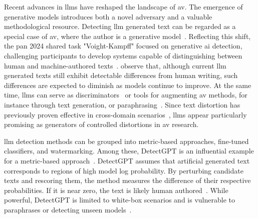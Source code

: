 Recent advances in \acp{llm} have reshaped the landscape of \ac{av}. 
The emergence of generative models introduces both a novel adversary and a valuable methodological resource.
Detecting \ac{llm} generated text can be regarded as a special case of \ac{av}, where the author is a generative model~\citep{bevendorff_overview_2024}. 
Reflecting this shift, the \ac{pan} 2024 shared task "Voight-Kampff" focused on generative \ac{ai} detection, challenging participants to develop systems capable of distinguishing between human and machine-authored texts~\citep{bevendorff_overview_2024,ayele_overview_2024}.
\citet{llm_detection_av_2025} observe that, although current \ac{llm} generated texts still exhibit detectable differences from human writing, such differences are expected to diminish as models continue to improve.
At the same time, \acp{llm} can serve as discriminators~\citep{futrzynski_pairwise_2021} or tools for augmenting \ac{av} methods, for instance through text generation, or paraphrasing~\citep{mao_raidar_2024,baradia_mirror_2025}.
Since text distortion has previously proven effective in cross-domain scenarios~\citep{bischoff_importance_2020}, \acp{llm} appear particularly promising as generators of controlled distortions in \ac{av} research.

\Ac{llm} detection methods can be grouped into metric-based approaches, fine-tuned classifiers, and watermarking. 
Among these, DetectGPT is an influential example for a metric-based approach~\citep{wang_stumbling_2024}.
DetectGPT assumes that artificial generated text corresponds to regions of high model log probability. 
By perturbing candidate texts and rescoring them, the method measures the difference of their respective probabilities.
If it is near zero, the text is likely human authored~\citep{mitchell_detectgpt_2023}. 
While powerful, DetectGPT is limited to white-box scenarios %
and is vulnerable to paraphrases or detecting unseen models~\citep{Wu_ODD_challenges_2025}.

